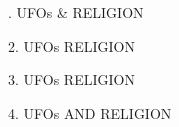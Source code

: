 \documentclass{article}\usepackage[T1]{fontenc}\usepackage{graphicx}
\begin{document}
\selectfont\fontsize{26}{34}. UFOs {\normalfont\sffamily{}\selectfont\&} RELIGION\par
2. UFOs {\normalfont\sffamily{}\selectfont\scalebox{1.18}{\&}} RELIGION\par
3. UFOs {\normalfont\sffamily{}\selectfont\scalebox{1.15}{\&}} RELIGION\par
4. UFOs {\fontsize{20}{20}\selectfont AND} RELIGION\par
\end{document}
